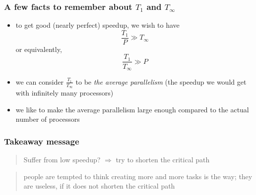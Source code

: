 \documentclass[12pt,dvipdfmx]{beamer}
\newcommand{\ao}[1]{{\color{blue}#1}}
\newcommand{\aka}[1]{{\color{red}#1}}
\begin{document}
\begin{frame}
\frametitle{A few facts to remember about $T_1$ and $T_\infty$}
\begin{itemize}
\item to get good (nearly perfect) speedup, we wish to have
  \[ \frac{T_1}{P} \gg T_\infty \]
  or equivalently, 
  \[ \frac{T_1}{T_\infty} \gg P \]

\item we can consider $\frac{T_1}{T_\infty}$
  to be {\it the average parallelism} (the speedup we would get
  with infinitely many processors)

\item we like to make the average parallelism
  large enough compared to the actual number of processors

\end{itemize}
\end{frame}

\begin{frame}
\frametitle{Takeaway message}

\begin{quote}
{\Large Suffer from low speedup?
$\Rightarrow$
\ao{try to shorten the critical path}}
\end{quote}

{\small
\begin{quote}
people are tempted to think
creating \aka{more and more tasks} is the way; 
they are useless, if it does not shorten the 
critical path
\end{quote}}

\begin{center}
\def\svgwidth{0.6\textwidth}
{\scriptsize }
\end{center}
\end{frame}
\end{document}
